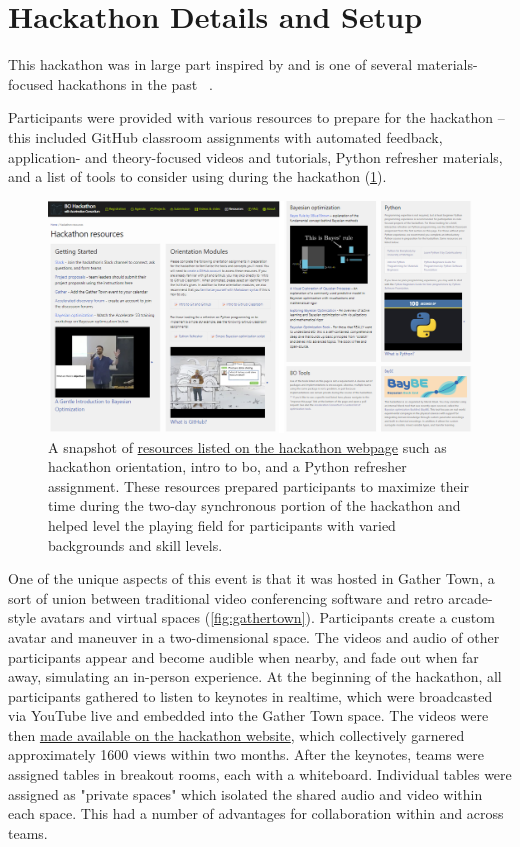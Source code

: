 \documentclass[superscriptaddress, nofootinbib,  amsmath, amssymb, twocolumn]{revtex4-2} %
\let\originalcite\cite
\renewcommand{\cite}[1]{\unskip~\originalcite{#1}}
\begin{document}
\section{Hackathon Details and Setup}

This hackathon was in large part inspired by \citet{jablonka_14_2023} and is one of several materials-focused hackathons in the past \cite{mulholland_hackathon_2015, sparks_insights_2024}. %

Participants were provided with various resources to prepare for the hackathon – this included GitHub classroom assignments with automated feedback, application- and theory-focused videos and tutorials, Python refresher materials, and a list of tools to consider using during the hackathon (\cref{fig:preparation}).

\begin{figure}
    \centering
    \includegraphics[width=0.98\linewidth]{latex/figures/preparation.png}
    \caption{A snapshot of \href{https://ac-bo-hackathon.github.io/resources/}{resources listed on the hackathon webpage} such as hackathon orientation, intro to \gls{bo}, and a Python refresher assignment. These resources prepared participants to maximize their time during the two-day synchronous portion of the hackathon and helped level the playing field for participants with varied backgrounds and skill levels.}
    \label{fig:preparation}
\end{figure}

One of the unique aspects of this event is that it was hosted in Gather Town, a sort of union between traditional video conferencing software and retro arcade-style avatars and virtual spaces (\cref{fig:gathertown}). Participants create a custom avatar and maneuver in a two-dimensional space. The videos and audio of other participants appear and become audible when nearby, and fade out when far away, simulating an in-person experience. At the beginning of the hackathon, all participants gathered to listen to keynotes in realtime, which were broadcasted via YouTube live and embedded into the Gather Town space. The videos were then \href{https://ac-bo-hackathon.github.io/videos-slides/}{made available on the hackathon website}, which collectively garnered approximately 1600 views within two months. After the keynotes, teams were assigned tables in breakout rooms, each with a whiteboard. Individual tables were assigned as "private spaces" which isolated the shared audio and video within each space. This had a number of advantages for collaboration within and across teams.
\end{document}
